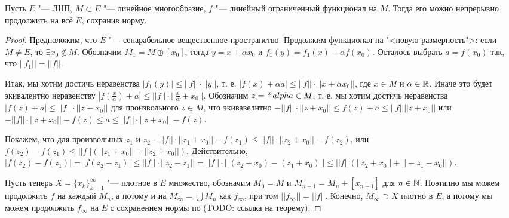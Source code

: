 \documentclass[main]{subfiles}
\begin{document}
\begin{theorem}
  Пусть $E$ "--- ЛНП, $M \subset E$ "--- линейное многообразие,
  $f$ "--- линейный ограниченный функционал на $M$. Тогда
  его можно непрерывно продолжить на всё $E$, сохранив норму.
\end{theorem}
\begin{proof}
  Предположим, что $E$ "--- сепарабельное вещественное пространство.
  Продолжим функционал на "<новую размерность">: если
  $M \ne E$, то $\exists x_0 \notin M$.
  Обозначим $M_1 = M \oplus [ x_0 ]$, тогда $y = x + \alpha x_0$
  и $f_1(y) = f_1(x) + \alpha f(x_0)$. Осталось выбрать
  $a = f(x_0)$ так, что $||f_1|| = ||f||$.
  
  Итак, мы хотим достичь неравенства $|f_1(y)| \le ||f|| \cdot ||y||$,
  т. е. $|f(x) + \alpha a| \le ||f|| \cdot ||x + \alpha x_0||$,
  где $x \in M$ и $\alpha \in \mathbb{R}$. Иначе это будет экивалентно
  неравенству $|f(\frac{x}{\alpha}) + a| \le ||f|| \cdot ||\frac{x}{\alpha} + x_0||$.
  Обозначим $z = \frac{x}\\alpha \in M$, т. е. мы хотим
  достичь неравенства $|f(z) + a| \le ||f|| \cdot ||z + x_0||$ для произвольного
  $z \in M$, что экивавелнтно $-||f|| \cdot ||z + x_0|| \le f(z) + a \le ||f|| ||z + x_0||$
  или $-||f|| \cdot ||z + x_0|| - f(z) \le a \le ||f|| \cdot ||z + x_0|| - f(z)$.
  
  Покажем, что для произвольных $z_1$ и $z_2$
  $-||f|| \cdot ||z_1 + x_0|| - f(z_1) \le ||f|| \cdot ||z_2 + x_0|| - f(z_2)$,
  или $f(z_2) - f(z_1) \le ||f|| (||z_1 + x_0|| + ||z_2 + x_0||)$.
  Действительно, $|f(z_2) - f(z_1)| = |f(z_2 - z_1)| \le ||f|| \cdot ||z_2 - z_1|| =
  ||f|| \cdot ||(z_2 + x_0) - (z_1 + x_0)|| \le ||f|| (||z_2 + x_0|| + ||-z_1 - x_0||)$.

  Пусть теперь $X = \{ x_k \}_{k = 1}^\infty$ "--- плотное в $E$ множество,
  обозначим $M_0 = M$ и $M_{n + 1} = M_n + [x_{n+1}]$ для $n \in \mathbb{N}$.
  Поэтапно мы можем продолжить $f$ на каждый $M_n$, а потому и на
  $M_\infty = \bigcup M_n$ как $f_\infty$, при том $||f_\infty|| = ||f||$.
  Конечно, $M_\infty \supset X$ плотно в $E$, а потому мы можем продолжить
  $f_\infty$ на $E$ с сохранением нормы по (TODO: ссылка на теорему).
\end{proof}
\end{document}
